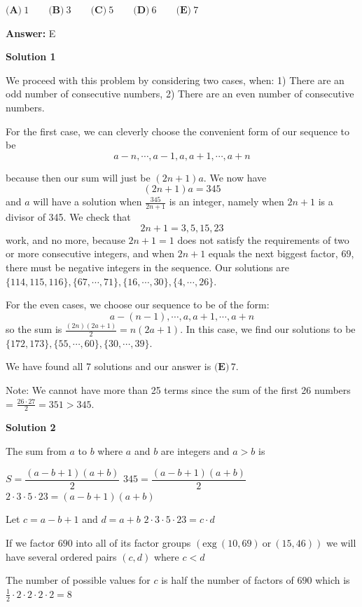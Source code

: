 \begin{enumerate}
 $\textbf{(A)}\ 1\qquad\textbf{(B)}\ 3\qquad\textbf{(C)}\ 5\qquad\textbf{(D)}\ 6\qquad\textbf{(E)}\ 7$

 \textbf{Answer: }E



\textbf{Solution 1}

We proceed with this problem by considering two cases, when: 1) There are an odd number of consecutive numbers, 2) There are an even number of consecutive numbers.

 For the first case, we can cleverly choose the convenient form of our sequence to be
 \[a-n,\cdots, a-1, a, a+1, \cdots, a+n\]

 because then our sum will just be $(2n+1)a$. We now have 
 \[(2n+1)a = 345\]and $a$ will have a solution when $\frac{345}{2n+1}$ is an integer, namely when $2n+1$ is a divisor of 345. We check that 
 \[2n+1 = 3, 5, 15, 23\]work, and no more, because $2n+1=1$ does not satisfy the requirements of two or more consecutive integers, and when $2n+1$ equals the next biggest factor, $69$, there must be negative integers in the sequence. Our solutions are $\{114,115, 116\}, \{67, \cdots, 71\}, \{16, \cdots, 30\}, \{4, \cdots, 26\}$.

 For the even cases, we choose our sequence to be of the form:
 \[a-(n-1), \cdots, a, a+1, \cdots, a+n\]so the sum is $\frac{(2n)(2a+1)}{2} = n(2a+1)$. In this case, we find our solutions to be $\{172, 173\}, \{55,\cdots, 60\}, \{30,\cdots, 39\}$.

 We have found all 7 solutions and our answer is $\boxed{\textbf{(E)} \, 7}$.

 Note: We cannot have more than 25 terms since the sum of the first 26 numbers = $\frac{26 \cdot 27}{2} = 351 > 345$.

 



\textbf{Solution 2}

The sum from $a$ to $b$ where $a$ and $b$ are integers and $a>b$ is 

 $S=\dfrac{(a-b+1)(a+b)}{2}$
$345=\dfrac{(a-b+1)(a+b)}{2}$
$2\cdot 3\cdot 5\cdot 23=(a-b+1)(a+b)$

 Let $c=a-b+1$ and $d=a+b$
$2\cdot 3\cdot 5\cdot 23=c\cdot d$

 If we factor $690$ into all of its factor groups $(\text{exg}~ (10,69) ~\text{or} ~(15,46))$ we will have several ordered pairs $(c,d)$ where $c<d$

 The number of possible values for $c$ is half the number of factors of $690$ which is $\frac{1}{2}\cdot2\cdot2\cdot2\cdot2=8$ 


\end{enumerate}
